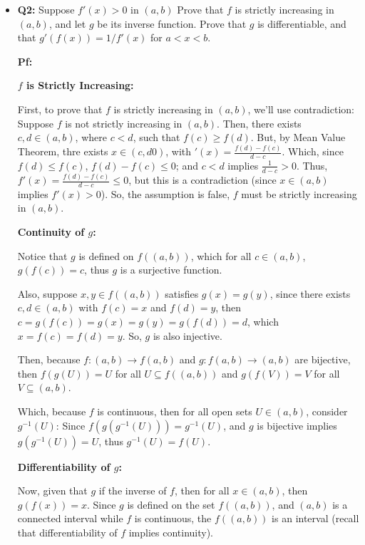 \documentclass{article}
\begin{document}
\hfill

\begin{itemize}
    \item \begin{myBox}[]{}
        \textbf{Q2:} Suppose $f'(x)>0$ in $(a,b)$ Prove that $f$ is strictly increasing in $(a,b)$, and let $g$ be its inverse function. 
        Prove that $g$ is differentiable, and that $g'(f(x))=1/f'(x)$ for $a<x<b$.
    \end{myBox}

    \textbf{Pf:}

    \textbf{$f$ is Strictly Increasing:}

    First, to prove that $f$ is strictly increasing in $(a,b)$, we'll use contradiction: Suppose $f$ is not strictly increasing in $(a,b)$.
    Then, there exists $c,d\in (a,b)$, where $c<d$, such that $f(c)\geq f(d)$. But, by Mean Value Theorem, thre exists $x\in (c,d0)$, with $'(x)=\frac{f(d)-f(c)}{d-c}$.
    Which, since $f(d)\leq f(c)$, $f(d)-f(c)\leq 0$; and $c<d$ implies $\frac{1}{d-c}>0$. Thus, $f'(x)=\frac{f(d)-f(c)}{d-c}\leq 0$, but this is a contradiction (since $x\in (a,b)$ implies $f'(x)>0$).
    So, the assumption is false, $f$ must be strictly increasing in $(a,b)$.

    \hfill

    \textbf{Continuity of $g$:}

    Notice that $g$ is defined on $f((a,b))$, which for all $c\in (a,b)$, $g(f(c)) = c$, thus $g$ is a surjective function.

    Also, suppose $x,y\in f((a,b))$ satisfies $g(x)=g(y)$, since there exists $c,d\in (a,b)$ with $f(c)=x$ and $f(d)=y$, 
    then $c=g(f(c))=g(x)=g(y)=g(f(d))=d$, which $x=f(c)=f(d)=y$. So, $g$ is also injective.

    Then, because $f:(a,b)\rightarrow f(a,b)$ and $g:f(a,b)\rightarrow (a,b)$ are bijective, then $f(g(U))=U$ for all $U\subseteq f((a,b))$ and $g(f(V))=V$ for all $V\subseteq (a,b)$.

    \hfill

    Which, because $f$ is continuous, then for all open sets $U\in (a,b)$, consider $g^{-1}(U)$:
    Since $f(g(g^{-1}(U)))=g^{-1}(U)$, and $g$ is bijective implies $g(g^{-1}(U))=U$, thus $g^{-1}(U)=f(U)$.


    \hfill

    \textbf{Differentiability of $g$:}

    Now, given that $g$ if the inverse of $f$, then for all $x\in(a,b)$, then $g(f(x))=x$.
    Since $g$ is defined on the set $f((a,b))$, and $(a,b)$ is a connected interval while $f$ is continuous, the $f((a,b))$ is an interval
    (recall that differentiability of $f$ implies continuity).


\end{itemize}
\end{document}
